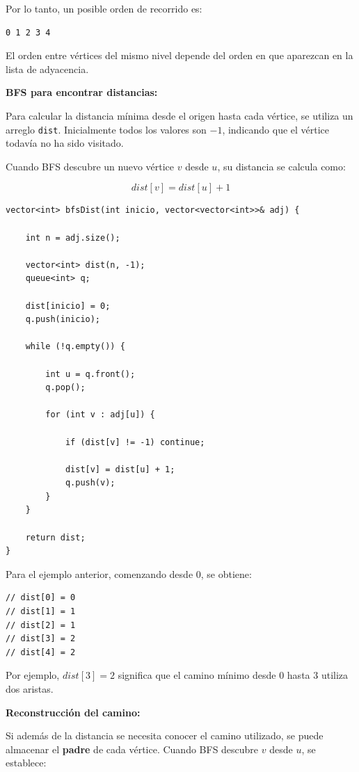 \documentclass[10pt,a4paper,twocolumn]{article}
\begin{document}
Por lo tanto, un posible orden de recorrido es:

\begin{lstlisting}[style=cpp]
0 1 2 3 4
\end{lstlisting}

El orden entre vértices del mismo nivel depende del orden en que
aparezcan en la lista de adyacencia.

\textbf{BFS para encontrar distancias:}

Para calcular la distancia mínima desde el origen hasta cada vértice,
se utiliza un arreglo \texttt{dist}. Inicialmente todos los valores
son $-1$, indicando que el vértice todavía no ha sido visitado.

Cuando BFS descubre un nuevo vértice $v$ desde $u$, su distancia se
calcula como:

\[
dist[v] = dist[u] + 1
\]

\begin{lstlisting}[style=cpp]
vector<int> bfsDist(int inicio, vector<vector<int>>& adj) {

    int n = adj.size();

    vector<int> dist(n, -1);
    queue<int> q;

    dist[inicio] = 0;
    q.push(inicio);

    while (!q.empty()) {

        int u = q.front();
        q.pop();

        for (int v : adj[u]) {

            if (dist[v] != -1) continue;

            dist[v] = dist[u] + 1;
            q.push(v);
        }
    }

    return dist;
}
\end{lstlisting}

Para el ejemplo anterior, comenzando desde $0$, se obtiene:

\begin{lstlisting}[style=cpp]
// dist[0] = 0
// dist[1] = 1
// dist[2] = 1
// dist[3] = 2
// dist[4] = 2
\end{lstlisting}

Por ejemplo, $dist[3] = 2$ significa que el camino mínimo desde
$0$ hasta $3$ utiliza dos aristas.

\textbf{Reconstrucción del camino:}

Si además de la distancia se necesita conocer el camino utilizado,
se puede almacenar el \textbf{padre} de cada vértice. Cuando BFS
descubre $v$ desde $u$, se establece:
\end{document}
